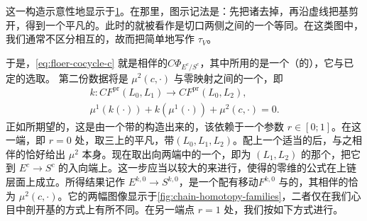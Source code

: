 这一构造示意性地显示于\cref{fig:monodromy-cut-open}。在那里，图示记法是：先把诸\trSingularFibre{}去掉，再沿虚线把基剪开，得到一个平凡的\trSymplectic\trFibration。此时的\trMonodromy{}就被看作是切口两侧之间的一个等同。在这类图中，我们通常不区分相互\trIsotopy{}的\trObject，故而把\trMonodromy{}简单地写作 $\tau_V$。
\begin{figure}[htbp]
\centering
{}
\caption{}\label{fig:monodromy-cut-open}
\end{figure}
于是，\eqref{eq:floer-cocycle-c} 就是相伴的\trInvariant{}$C\Phi_{E^c/S^c}$，其中所用的是一个（\trRegular{}的）\trRelative\trPerturbationDatum，它与已定的\trFloerDatum{}选取\trCompatible。
第二份数据将是 $\mu^2(c,\cdot)$ 与零映射之间的一个\trChainHomotopy，即
\begin{equation}\label{eq:chain-homotopy-k}
\boxed{\begin{gathered}
k\colon CF^{\mathrm{pr}}(L_0,L_1)\longrightarrow CF^{\mathrm{pr}}(L_0,L_2),\\
\mu^1(k(\cdot))+k(\mu^1(\cdot))+\mu^2(c,\cdot)=0.
\end{gathered}}
\end{equation}
正如所期望的，这是由一个带\trStriplikeEnd{}的\trLefschetzFibration{}\trFamily{}构造出来的，该\trFamily{}依赖于一个参数 $r\in[0;1]$。在这一端，即 $r=0$ 处，取三\trPointedDisc{}上的平凡\trFibration，带\trLagrange\trBoundaryCondition{}$(L_0,L_1,L_2)$。配上一个适当的\trPerturbationDatum{}后，与之相伴的\trInvariant{}恰好给出 $\mu^2$ 本身。现在取出向两端中的一个，即\trLabel{}为 $(L_1,L_2)$ 的那个，把它\trGluing{}到 $E^c\to S^c$ 的入向端上。这一步应当以较大的\trGluingLength{}来进行，使得\trPseudoholomorphic\trSection{}的零维\trModuliSpace{}的\trGluing{}公式在上链层面上成立。所得结果记作 $E^{k,0}\to S^{k,0}$，是一个配有移动\trBoundaryCondition{}$F^{k,0}$ 与\trRelative\trPerturbationDatum{}的\trFibration，其相伴的\trInvariant{}恰为 $\mu^2(c,\cdot)$。它的两幅图像显示于\cref{fig:chain-homotopy-families}，二者仅在我们心目中剖开基的方式上有所不同。在另一端点 $r=1$ 处，我们按如下方式进行。
